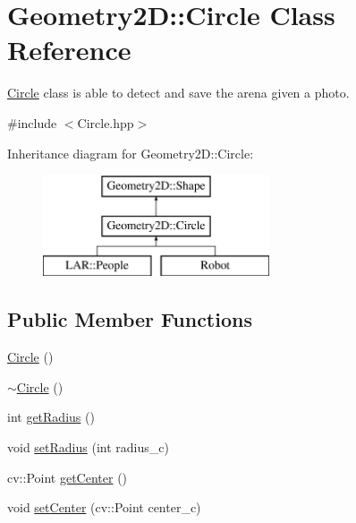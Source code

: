 \hypertarget{class_geometry2_d_1_1_circle}{}\section{Geometry2D\+:\+:Circle Class Reference}
\label{class_geometry2_d_1_1_circle}


\mbox{\hyperlink{class_geometry2_d_1_1_circle}{Circle}} class is able to detect and save the arena given a photo.  




{\ttfamily \#include $<$Circle.\+hpp$>$}

Inheritance diagram for Geometry2D\+:\+:Circle\+:\begin{figure}[H]
\begin{center}
\leavevmode
\includegraphics[height=3.000000cm]{class_geometry2_d_1_1_circle}
\end{center}
\end{figure}
\subsection*{Public Member Functions}
\begin{DoxyCompactItemize}
\item 
\mbox{\hyperlink{class_geometry2_d_1_1_circle_a8e740ff9413a9abac8f7c666b89c4366}{Circle}} ()
\item 
\mbox{\hyperlink{class_geometry2_d_1_1_circle_ae5bfc08e732dd97fc3cc4c485787be44}{$\sim$\+Circle}} ()
\item 
int \mbox{\hyperlink{class_geometry2_d_1_1_circle_a93adf6a4690d211a16800d0ddbeb9949}{get\+Radius}} ()
\item 
void \mbox{\hyperlink{class_geometry2_d_1_1_circle_acdeabe8582b65611dbc117cdc7604f18}{set\+Radius}} (int radius\+\_\+c)
\item 
cv\+::\+Point \mbox{\hyperlink{class_geometry2_d_1_1_circle_ad6605cfef3530b9185213f694c9fca6a}{get\+Center}} ()
\item 
void \mbox{\hyperlink{class_geometry2_d_1_1_circle_a1d73cfc9f0e4fe3eb8a93e2a5a4f0ffd}{set\+Center}} (cv\+::\+Point center\+\_\+c)
\end{DoxyCompactItemize}
